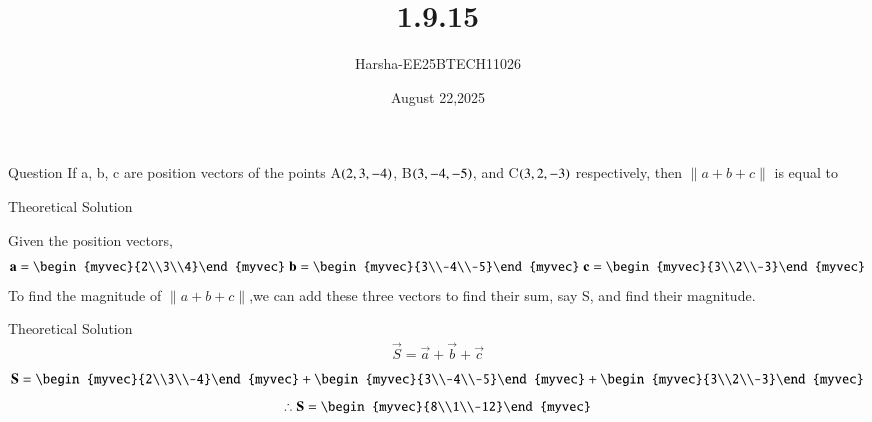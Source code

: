 \documentclass{beamer}
\title %
{1.9.15}
\date{August 22,2025}
\author %
{Harsha-EE25BTECH11026}
\begin{document}
\frame{\titlepage}
\begin{frame}{Question}
If a, b, c are position vectors of the points A$\left(2, 3, -4\right)$, B$\left(3, -4, -5\right)$, and C$\left(3, 2, -3\right)$ respectively, then $\|a + b + c\|$ is equal to
\end{frame}



\begin{frame}{Theoretical Solution}

Given the position vectors,
\begin{align}
    \vec{a}=\begin{myvec}{2\\3\\4}\end{myvec}\;
    \vec{b}=\begin{myvec}{3\\-4\\-5}\end{myvec}\;
    \vec{c}=\begin{myvec}{3\\2\\-3}\end{myvec}
\end{align}
To find the magnitude of $\|a+b+c\|$,we can add these three vectors to find their sum, say S, and find their magnitude.

\end{frame}

\begin{frame}{Theoretical Solution}
\begin{align}
    \vec{S}=\vec{a}+\vec{b}+\vec{c}
\end{align}
\begin{align}
    \vec{S}=\begin{myvec}{2\\3\\-4}\end{myvec}+\begin{myvec}{3\\-4\\-5}\end{myvec}+\begin{myvec}{3\\2\\-3}\end{myvec}
\end{align}
\begin{align}
    \therefore\vec{S}=\begin{myvec}{8\\1\\-12}\end{myvec}
\end{align}
\end{frame}
\end{document}
